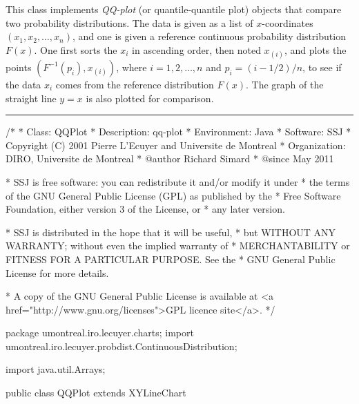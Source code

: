 
This class implements \emph{QQ-plot} (or quantile-quantile plot)
objects that compare two probability distributions.
The data is given as a list of $x$-coordinates $(x_1, x_2, \ldots, x_{n})$,
and one is given a reference continuous probability distribution  $F(x)$.
One first sorts the $x_i$ in ascending order, then noted $x_{(i)}$, and
plots the points $(F^{-1}(p_i), x_{(i)})$, where
$i= 1, 2, \ldots, n$ and  $p_i = (i- 1/2)/n$,
to see if the data $x_i$ comes from the reference distribution  $F(x)$.
The graph of the straight line $y=x$ is also plotted for comparison.



\bigskip\hrule
\begin{code}
\begin{hide}
/*
 * Class:        QQPlot
 * Description:  qq-plot
 * Environment:  Java
 * Software:     SSJ 
 * Copyright (C) 2001  Pierre L'Ecuyer and Universite de Montreal
 * Organization: DIRO, Universite de Montreal
 * @author       Richard Simard
 * @since        May 2011

 * SSJ is free software: you can redistribute it and/or modify it under
 * the terms of the GNU General Public License (GPL) as published by the
 * Free Software Foundation, either version 3 of the License, or
 * any later version.

 * SSJ is distributed in the hope that it will be useful,
 * but WITHOUT ANY WARRANTY; without even the implied warranty of
 * MERCHANTABILITY or FITNESS FOR A PARTICULAR PURPOSE.  See the
 * GNU General Public License for more details.

 * A copy of the GNU General Public License is available at
   <a href="http://www.gnu.org/licenses">GPL licence site</a>.
 */
\end{hide}
package umontreal.iro.lecuyer.charts;
   import umontreal.iro.lecuyer.probdist.ContinuousDistribution;\begin{hide}
   import java.util.Arrays;
\end{hide}


public class QQPlot extends XYLineChart \begin{hide} {
   private double[][] Q;        // data points
   private double[][] Lin;      // line y = x

   private void initLinear (double a, double b)
   {
      // line y = x in [a, b] by steps of h
      int m = 100;
      double h = (b - a)/ m;
      Lin = new double[2][m+1];
      for (int i = 0; i <= m; i++)
         Lin[0][i] = Lin[1][i] = a + h * i;
   }


   private void initPoints (ContinuousDistribution dist, double[] data,
                            int numPoints)
   {
      int i;
      double p;
      Q = new double[2][numPoints];     // q_i = cdf^(-1)(p_i)

      for (i = 0; i < numPoints; i++)
         Q[1][i] = data[i];
      Arrays.sort(Q[1]);
      for (i = 0; i < numPoints; i++) {
         p = (i + 0.5)/numPoints;
         Q[0][i] = dist.inverseF(p);
      }
   }\end{hide}
\end{code}

